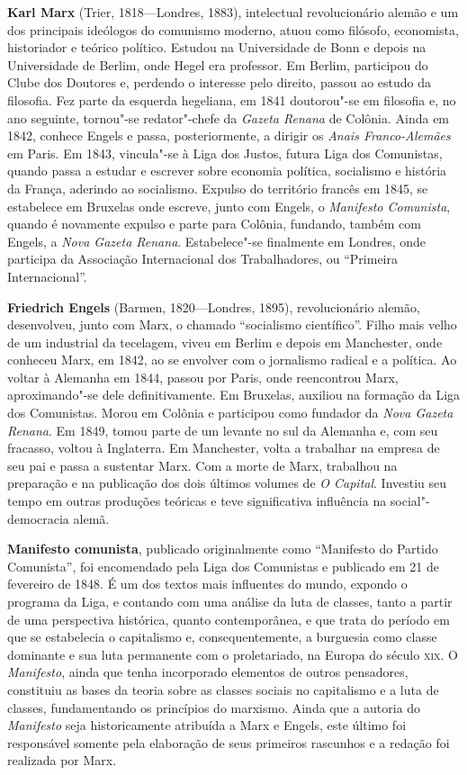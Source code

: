 
\textbf{Karl Marx} (Trier, 1818---Londres, 1883), intelectual revolucionário
alemão e um dos principais ideólogos do comunismo moderno, atuou como
filósofo, economista, historiador e teórico político. Estudou na Universidade de
Bonn e depois na Universidade de Berlim, onde Hegel era professor. Em Berlim,
participou do Clube dos Doutores e, perdendo o interesse pelo direito, passou ao
estudo da filosofia. Fez parte da esquerda hegeliana, em 1841 doutorou"-se em
filosofia e, no ano seguinte, tornou"-se redator"-chefe da \textit{Gazeta Renana}
de Colônia. Ainda em 1842, conhece Engels e passa, posteriormente, a dirigir os
\textit{Anais Franco-Alemães} em Paris. Em 1843, vincula"-se à Liga dos Justos,
futura Liga dos Comunistas, quando passa a estudar e escrever sobre economia política,
socialismo e história da França, aderindo ao socialismo. Expulso do território francês em
1845, se estabelece em Bruxelas onde escreve, junto com Engels, o
\textit{Manifesto Comunista}, quando é novamente expulso e parte para Colônia, fundando,
também com Engels, a \textit{Nova Gazeta Renana}. 
Estabelece"-se finalmente em Londres, onde participa da Associação Internacional dos
Trabalhadores, ou “Primeira Internacional”. 

\textbf{Friedrich Engels} (Barmen, 1820---Londres, 1895), revolucionário alemão,
desenvolveu, junto com Marx, o chamado “socialismo científico”. Filho mais velho
de um industrial da tecelagem, viveu em Berlim e depois em Manchester, onde
conheceu Marx, em 1842, ao se envolver com o jornalismo radical e a política.
Ao voltar à Alemanha em 1844, passou por Paris, onde reencontrou Marx,
aproximando"-se dele definitivamente. Em Bruxelas, auxiliou na formação da Liga
dos Comunistas. Morou em Colônia e participou como fundador da \textit{Nova
Gazeta Renana}. Em 1849, tomou parte de um levante no sul da Alemanha e, com seu
fracasso, voltou à Inglaterra. Em Manchester, volta a trabalhar na empresa de
seu pai e passa a sustentar Marx. 
Com a morte de Marx, trabalhou na preparação e na publicação dos dois últimos
volumes de \textit{O Capital}. Investiu seu tempo em outras produções teóricas e
teve significativa influência na social"-democracia alemã.

\textbf{Manifesto comunista},
publicado originalmente como “Manifesto do Partido Comunista”, foi encomendado
pela Liga dos Comunistas e publicado em 21 de fevereiro de 1848. É um dos textos
mais influentes do mundo, expondo o programa da Liga, e contando com uma análise
da luta de classes, tanto a partir de uma perspectiva histórica, quanto
contemporânea, e que trata do período em que se estabelecia o capitalismo e,
consequentemente, a burguesia como classe dominante e sua luta permanente com o
proletariado, na Europa do século \textsc{xix}. O \textit{Manifesto}, ainda que tenha
incorporado elementos de outros pensadores, constituiu as bases da teoria sobre
as classes sociais no capitalismo e a luta de classes, fundamentando os
princípios do marxismo. Ainda que a autoria do \textit{Manifesto} seja
historicamente atribuída a Marx e Engels, este último foi responsável somente
pela elaboração de seus primeiros rascunhos e a redação foi realizada por Marx.
       
